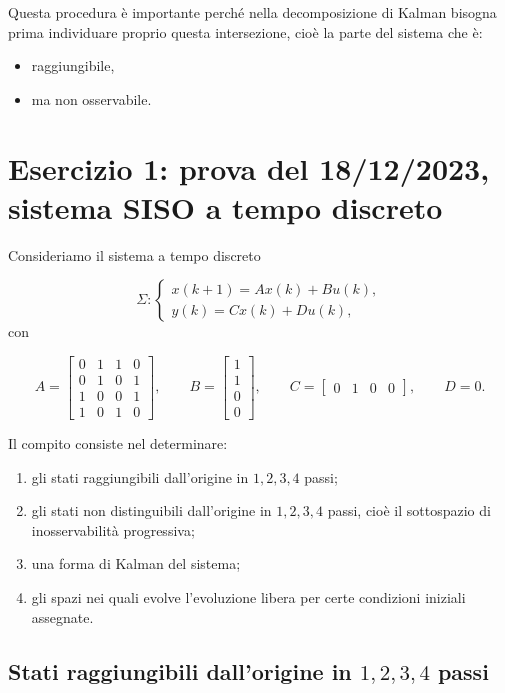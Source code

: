Questa procedura è importante perché nella decomposizione di Kalman bisogna prima individuare proprio questa intersezione, cioè la parte del sistema che è:
\begin{itemize}
    \item raggiungibile,
    \item ma non osservabile.
\end{itemize}

\bigskip

\section{Esercizio 1: prova del 18/12/2023, sistema SISO a tempo discreto}

Consideriamo il sistema a tempo discreto

\[
\Sigma:
\begin{cases}
x(k+1)=Ax(k)+Bu(k),\\
y(k)=Cx(k)+Du(k),
\end{cases}
\]
con

\[
A=
\begin{bmatrix}
0 & 1 & 1 & 0\\
0 & 1 & 0 & 1\\
1 & 0 & 0 & 1\\
1 & 0 & 1 & 0
\end{bmatrix},
\qquad
B=
\begin{bmatrix}
1\\
1\\
0\\
0
\end{bmatrix},
\qquad
C=
\begin{bmatrix}
0 & 1 & 0 & 0
\end{bmatrix},
\qquad
D=0.
\]

Il compito consiste nel determinare:
\begin{enumerate}
    \item gli stati raggiungibili dall'origine in \(1,2,3,4\) passi;
    \item gli stati non distinguibili dall'origine in \(1,2,3,4\) passi, cioè il sottospazio di inosservabilità progressiva;
    \item una forma di Kalman del sistema;
    \item gli spazi nei quali evolve l'evoluzione libera per certe condizioni iniziali assegnate.
\end{enumerate}

\subsection{Stati raggiungibili dall'origine in \(1,2,3,4\) passi}

